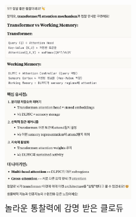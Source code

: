 \documentclass[../note.tex]{subfiles}
\begin{document}
\begin{figure}[htbp]
  \centering
  \includegraphics[width=0.5\textwidth]{image/ch6_transformer}
  \caption{놀라운 통찰력에 감명 받은 클로듀}
  \label{fig:ch6_transformer}
\end{figure}
\end{document}
